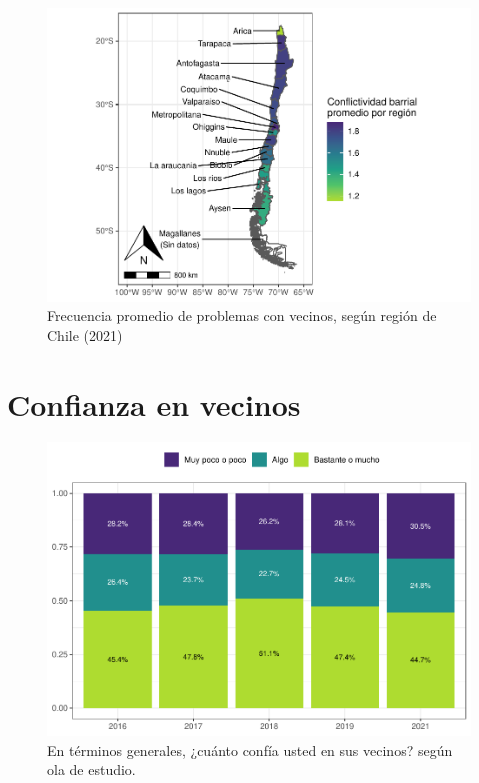 \documentclass[
  12pt,
]{book}
\begin{document}
\begin{figure}

{\centering \includegraphics{reporte-elsoc_files/figure-latex/confli-region2-1} 

}

\caption{Frecuencia promedio de problemas con vecinos, según región de Chile (2021)}\label{fig:confli-region2}
\end{figure}

\hypertarget{confianza-en-vecinos}{%
\section{Confianza en vecinos}\label{confianza-en-vecinos}}

\begin{figure}

{\centering \includegraphics{reporte-elsoc_files/figure-latex/vecinos-ola-1} 

}

\caption{En términos generales, ¿cuánto confía usted en sus vecinos? según ola de estudio.}\label{fig:vecinos-ola}
\end{figure}
\end{document}
